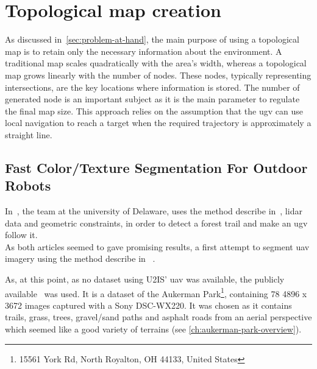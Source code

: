 \chapter{Topological map creation}\label{ch:topological-map-creation}

As discussed in~\ref{sec:problem-at-hand}, the main purpose of using a topological map is to retain only the necessary information about the environment.
A traditional map scales quadratically with the area’s width, whereas a topological map grows linearly with the number of nodes.
These nodes, typically representing intersections, are the key locations where information is stored.
The number of generated node is an important subject as it is the main parameter to regulate the final map size.
This approach relies on the assumption that the \gls{ugv} can use local navigation to reach a target when the required trajectory is approximately a straight line.


\section{Fast Color/Texture Segmentation For Outdoor Robots}

In~\cite{rasmussen_appearance_2009}, the team at the university of Delaware, uses the method describe in~\cite{rufus_blas_fast_2008},
lidar data and geometric constraints, in order to detect a forest trail and make an \gls{ugv} follow it.\\
As both articles seemed to gave promising results, a first attempt to segment \gls{uav} imagery using the method describe in
~\cite{rufus_blas_fast_2008}.

As, at this point, as no dataset using U2IS' \gls{uav} was available, the publicly available~\cite{noauthor_aukerman_nodate} was used.
It is a dataset of the Aukerman Park\footnote{15561 York Rd, North Royalton, OH 44133, United States}, containing 78
4896 x 3672 images captured with a Sony DSC-WX220.
It was chosen as it contains trails, grass, trees, gravel/sand paths and asphalt roads from an aerial perspective which
seemed like a good variety of terrains (see \cref{ch:aukerman-park-overview}).

